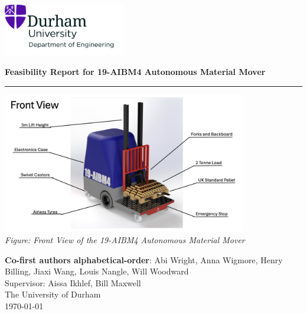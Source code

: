 \documentclass[12pt]{article}
\begin{document}
\begin{titlepage}
\centering
\includegraphics[width=0.4\textwidth]{UoD_Engineering.jpg} \\
\vspace{20mm}

{\LARGE \textbf{Feasibility Report for 19-AIBM4 Autonomous Material Mover}} \\[10pt]

\vspace{5mm}\hrule\vspace{15mm}

\includegraphics[width=0.8\textwidth]{Screenshot 2024-11-14 at 17.52.59.png}  \\  
\vspace{5mm}
\textit{Figure: Front View of the 19-AIBM4 Autonomous Material Mover} \\

\vspace{20mm}

{\large \textbf{Co-first authors alphabetical-order}: Abi Wright, Anna Wigmore, Henry Billing, Jiaxi Wang, Louis Nangle, Will Woodward} \\ \vspace{2mm}
{Supervisor: Aissa Ikhlef, Bill Maxwell} \\[10pt]
{\small The University of Durham \\ \today}
\end{titlepage}
\end{document}
